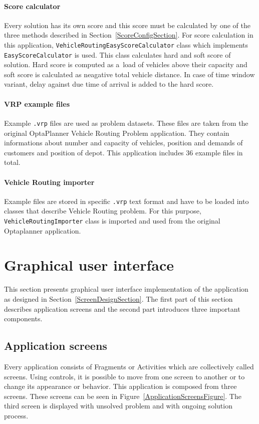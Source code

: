 \paragraph{Score calculator}
Every solution has its own score and this score must be calculated by one of the three methods described in
Section~\ref{ScoreConfigSection}. For score calculation in this application, \texttt{VehicleRoutingEasyScoreCalculator}
class which implements \texttt{EasyScoreCalculator} is used. This class calculates hard and soft score of solution. Hard
score is computed as a~load of vehicles above their capacity and soft score is calculated as neagative total vehicle
distance. In case of time window variant, delay against due time of arrival is added to the hard score.

\paragraph{VRP example files}
Example \texttt{.vrp} files are used as problem datasets. These files are taken from the original OptaPlanner Vehicle
Routing Problem application. They contain informations about number and capacity of vehicles, position and demands of
customers and position of depot. This application includes 36 example files in total.

\paragraph{Vehicle Routing importer}
Example files are stored in specific \texttt{.vrp} text format and have to be loaded into classes that describe Vehicle
Routing problem. For this purpose, \texttt{VehicleRoutingImporter} class is imported and used from the original
Optaplanner application.

\section{Graphical user interface}\label{GuiSection}
This section presents graphical user interface implementation of the application as designed in
Section~\ref{ScreenDesignSection}. The first part of this section describes application screens and the second part
introduces three important components.

\subsection{Application screens}
Every application consists of Fragments or Activities which are collectively called screens. Using controls, it is
possible to move from one screen to another or to change its appearance or behavior. This application is composed from
three screens. These screens can be seen in Figure~\ref{ApplicationScreensFigure}. The third screen is displayed with
unsolved problem and with ongoing solution process.

